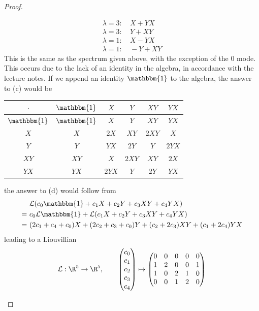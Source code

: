 \begin{proof}
\begin{parts}
	\begin{align*}
		\lambda=3:&~ X + YX\\
		\lambda=3:&~Y+XY\\
		\lambda=1:&~X - YX\\
		\lambda=1:&~-Y + XY
	\end{align*}
	This is the same as the spectrum given above, with the exception of the 0 mode. This occurs due to the lack of an identity in the algebra, in accordance with the lecture notes. If we append an identity $\mathbbm{1}$ to the algebra, the answer to (c) would be
	\begin{center}
		\renewcommand\arraystretch{1.3}
		\setlength\doublerulesep{0pt}
		\begin{tabular}{c|c|c|c|c|c|}
			$\cdot$ & $\mathbbm{1}$ & $X$ & $Y$ & $XY$ & $YX$ \\
			\hline
			$\mathbbm{1}$ & $\mathbbm{1}$  & $X$ & $Y$ & $XY$ & $YX$ \\
			\hline
			$X$ & $X$& $2X$ & $XY$ & $2XY$ & $X$ \\ 
			\hline
			$Y$ & $Y$& $YX$ & $2Y$ & $Y$ & $2YX$ \\ 
			\hline
			$XY$ & $XY$& $X$ & $2XY$ & $XY$ & $2X$ \\ 
			\hline
			$YX$ & $YX$& $2YX$ & $Y$ & $2Y$ & $YX$ \\ 
			\hline
		\end{tabular}
	\end{center}
	the answer to (d) would follow from
	\begin{align*}
		&~\mathcal{L}(c_0 \mathbbm{1}+ c_1 X + c_2 Y + c_3 XY + c_4 YX)\\
		=&~c_0\mathcal{L} \mathbbm{1}+\mathcal{L}(c_1 X + c_2 Y + c_3 XY + c_4 YX)\\
		=&~(2c_1+c_4+c_0)X + (2c_2+c_3+c_0)Y + (c_2+2c_3)XY + (c_1+2c_4)YX
	\end{align*}
	leading to a Liouvillian
	\[
	\mathcal{L}:\R^5 \to \R^5,\qquad \begin{pmatrix} c_0 \\ c_1 \\ c_2 \\ c_3 \\c_4 \end{pmatrix} \mapsto \begin{pmatrix}
		0 & 0 & 0 & 0 & 0 \\ 
		1 & 2 & 0 & 0 & 1\\
		1 & 0 & 2 & 1 & 0 \\
		0 & 0 & 1 & 2 & 0 \\

\end{pmatrix}\]
\end{parts}
\end{proof}
